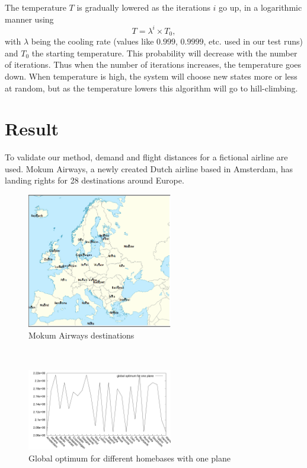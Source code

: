 \documentclass[journal]{IEEEtran}
\begin{document}
The temperature $T$ is gradually lowered as the iterations $i$ go up, in a logarithmic manner using
\begin{equation}
T = \lambda^i \times T_0,
\end{equation}
with $\lambda$ being the cooling rate (values like $0.999$, $0.9999$, etc. used in our test runs) and $T_0$ the starting temperature. This probability will decrease with the number of iterations. Thus when the number of iterations increases, the temperature goes down. When temperature is high, the system will choose new states more or less at random, but as the temperature lowers this algorithm will go to hill-climbing. 
\section{Result}
To validate our method, demand and flight distances for a fictional airline are used. Mokum Airways, a newly created Dutch airline based in Amsterdam, has landing rights for 28 destinations around Europe.\\
\begin{figure}[!h]
\centering
\includegraphics[width=2.5in]{europe}
\caption{Mokum Airways destinations}
\label{fig:europe}
\end{figure}
\\
\begin{figure}[!h]
\centering
\includegraphics[width=2.5in]{different_homebases_one_plane}
\caption{Global optimum for different homebases with one plane}
\label{fig:different_homebase_one_plane}
\end{figure}
\end{document}
